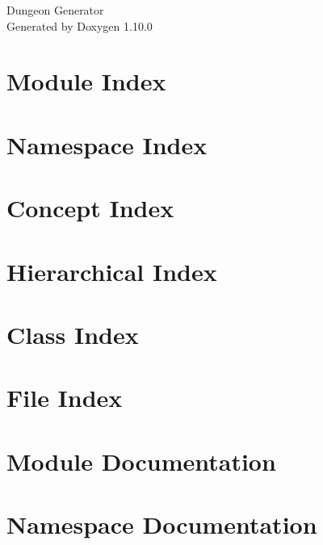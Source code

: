 \documentclass[twoside]{book}
\newcommand{\+}{\discretionary{\mbox{\scriptsize$\hookleftarrow$}}{}{}}
\newcommand{\clearemptydoublepage}{%
    \newpage{\pagestyle{empty}\cleardoublepage}%
  }
\begin{document}
  \raggedbottom
    \hypersetup{pageanchor=false,
                bookmarksnumbered=true,
                pdfencoding=unicode
               }
  \begin{titlepage}
  \vspace*{7cm}
  \begin{center}%
  {\Large Dungeon Generator}\\
  \vspace*{1cm}
  {\large Generated by Doxygen 1.10.0}\\
  \end{center}
  \end{titlepage}
  \clearemptydoublepage
  \tableofcontents
  \clearemptydoublepage
  \hypersetup{pageanchor=true}

\chapter{Module Index}

\chapter{Namespace Index}

\chapter{Concept Index}

\chapter{Hierarchical Index}

\chapter{Class Index}

\chapter{File Index}

\chapter{Module Documentation}

\chapter{Namespace Documentation}











\end{document}
